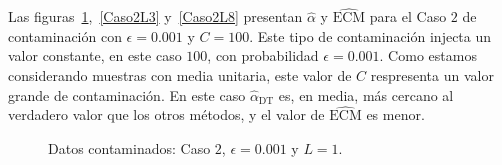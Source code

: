 Las figuras~\ref{Caso2L1},~\ref{Caso2L3} y~\ref{Caso2L8} presentan $\widehat{\alpha}$ y $\widehat{\text{ECM}}$ para el Caso $2$ de contaminación con $\epsilon=0.001$ y $C=100$. Este tipo de contaminación injecta un valor constante, en este caso $100$, con probabilidad $\epsilon=0.001$. Como estamos considerando muestras con media unitaria, este valor de $C$ respresenta un valor grande de contaminación. En este caso $\widehat\alpha_{\text{DT}}$ es, en media, más cercano al verdadero valor que los otros métodos, y el valor de $\widehat{\text{ECM}}$ es menor.

\begin{figure}[h!]
	\caption{\label{Caso2L1}\small Datos contaminados: Caso $2$, $\epsilon=0.001$ y $L=1$.}
\end{figure}

